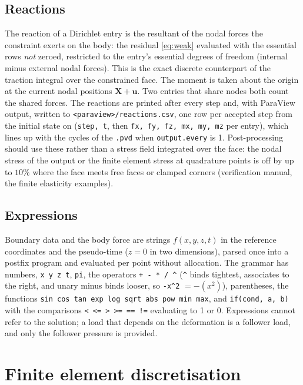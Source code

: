 \documentclass[11pt]{article}
\newcommand{\bX}{\bm{X}}
\newcommand{\bu}{\bm{u}}
\DeclareRobustCommand{\code}[1]{{\def\_{\textunderscore\allowbreak}\texttt{#1}}}
\DeclareRobustCommand{\file}[1]{{\def\_{\textunderscore\allowbreak}\texttt{#1}}}
\begin{document}
\subsection{Reactions}
\label{sec:reactions}

The reaction of a Dirichlet entry is the resultant of the nodal forces the
constraint exerts on the body: the residual \eqref{eq:weak} evaluated with
the essential rows \emph{not} zeroed, restricted to the entry's essential
degrees of freedom (internal minus external nodal forces).  This is the
exact discrete counterpart of the traction integral over the constrained
face.  The moment is taken about the origin at the current nodal positions
$\bX + \bu$.  Two entries that share nodes both count the shared forces.
The reactions are printed after every step and, with ParaView output,
written to \file{<paraview>/reactions.csv}, one row per accepted step from
the initial state on (\code{step, t}, then \code{fx, fy, fz, mx, my, mz}
per entry), which lines up with the cycles of the \file{.pvd} when
\code{output.every} is 1.  Post-processing should use these rather than a
stress field integrated over the face: the nodal stress of the output or
the finite element stress at quadrature points is off by up to $10\%$
where the face meets free faces or clamped corners (verification manual,
the finite elasticity examples).

\subsection{Expressions}

Boundary data and the body force are strings $f(x, y, z, t)$ in the
reference coordinates and the pseudo-time ($z = 0$ in two dimensions),
parsed once into a postfix program and evaluated per point without
allocation.  The grammar has numbers, \code{x y z t}, \code{pi}, the
operators \code{+ - * / \^{}} (\code{\^{}} binds tightest, associates to the
right, and unary minus binds looser, so \code{-x\^{}2} $= -(x^2)$),
parentheses, the functions \code{sin cos tan exp log sqrt abs pow min max},
and \code{if(cond, a, b)} with the comparisons \code{< <= > >= == !=}
evaluating to 1 or 0.  Expressions cannot refer to the solution; a load
that depends on the deformation is a follower load, and only the follower
pressure is provided.

\section{Finite element discretisation}
\label{sec:fem}
\end{document}
